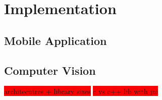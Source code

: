 \chapter{Implementation}
\section{Mobile Application}
\section{Computer Vision}
\colorbox{red}{architecutres + library sizes}
\colorbox{red}{c vs c++ lib with jni}
